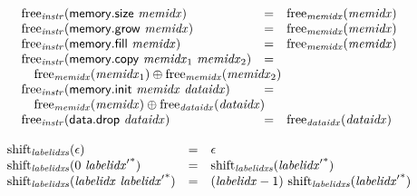 $$\begin{array}[t]{@{}lcl@{}l@{}}
{\begin{array}[t]{@{}l@{}}
\end{array}
} \\
{\mathrm{free}}_{\mathit{instr}}(\mathsf{memory{.}size}~{\mathit{memidx}}) & = & {\mathrm{free}}_{\mathit{memidx}}({\mathit{memidx}}) \\
{\mathrm{free}}_{\mathit{instr}}(\mathsf{memory{.}grow}~{\mathit{memidx}}) & = & {\mathrm{free}}_{\mathit{memidx}}({\mathit{memidx}}) \\
{\mathrm{free}}_{\mathit{instr}}(\mathsf{memory{.}fill}~{\mathit{memidx}}) & = & {\mathrm{free}}_{\mathit{memidx}}({\mathit{memidx}}) \\
{\mathrm{free}}_{\mathit{instr}}(\mathsf{memory{.}copy}~{\mathit{memidx}}_1~{\mathit{memidx}}_2) & = & & \\
 \multicolumn{4}{@{}l@{}}{\quad
\begin{array}[t]{@{}l@{}}
{\mathrm{free}}_{\mathit{memidx}}({\mathit{memidx}}_1) \oplus {\mathrm{free}}_{\mathit{memidx}}({\mathit{memidx}}_2) \\
\end{array}
} \\
{\mathrm{free}}_{\mathit{instr}}(\mathsf{memory{.}init}~{\mathit{memidx}}~{\mathit{dataidx}}) & = & & \\
 \multicolumn{4}{@{}l@{}}{\quad
\begin{array}[t]{@{}l@{}}
{\mathrm{free}}_{\mathit{memidx}}({\mathit{memidx}}) \oplus {\mathrm{free}}_{\mathit{dataidx}}({\mathit{dataidx}}) \\
\end{array}
} \\
{\mathrm{free}}_{\mathit{instr}}(\mathsf{data{.}drop}~{\mathit{dataidx}}) & = & {\mathrm{free}}_{\mathit{dataidx}}({\mathit{dataidx}}) \\
\end{array}
$$

\vspace{1ex}

$$
\begin{array}[t]{@{}lcl@{}l@{}}
{\mathrm{shift}}_{\mathit{labelidxs}}(\epsilon) & = & \epsilon \\
{\mathrm{shift}}_{\mathit{labelidxs}}(0~{{\mathit{labelidx}'}^\ast}) & = & {\mathrm{shift}}_{\mathit{labelidxs}}({{\mathit{labelidx}'}^\ast}) \\
{\mathrm{shift}}_{\mathit{labelidxs}}({\mathit{labelidx}}~{{\mathit{labelidx}'}^\ast}) & = & ({\mathit{labelidx}} - 1)~{\mathrm{shift}}_{\mathit{labelidxs}}({{\mathit{labelidx}'}^\ast}) \\
\end{array}
$$


